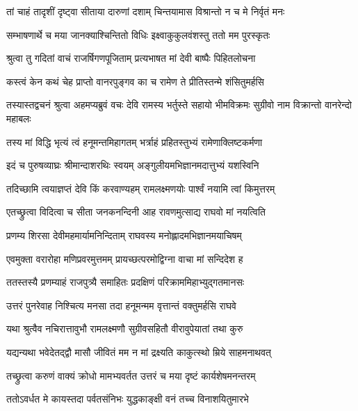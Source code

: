 \twolineshloka
{तां चाहं तादृशीं दृष्ट्वा सीताया दारुणां दशाम्}
{चिन्तयामास विश्रान्तो न च मे निर्वृतं मनः} %

\twolineshloka
{सम्भाषणार्थे च मया जानक्याश्चिन्तितो विधिः}
{इक्ष्वाकुकुलवंशस्तु ततो मम पुरस्कृतः} %

\twolineshloka
{श्रुत्वा तु गदितां वाचं राजर्षिगणपूजिताम्}
{प्रत्यभाषत मां देवी बाष्पैः पिहितलोचना} %

\twolineshloka
{कस्त्वं केन कथं चेह प्राप्तो वानरपुङ्गव}
{का च रामेण ते प्रीतिस्तन्मे शंसितुमर्हसि} %

\threelineshloka
{तस्यास्तद्वचनं श्रुत्वा अहमप्यब्रुवं वचः}
{देवि रामस्य भर्तुस्ते सहायो भीमविक्रमः}
{सुग्रीवो नाम विक्रान्तो वानरेन्दो महाबलः} %

\twolineshloka
{तस्य मां विद्धि भृत्यं त्वं हनूमन्तमिहागतम्}
{भर्त्राहं प्रहितस्तुभ्यं रामेणाक्लिष्टकर्मणा} %

\twolineshloka
{इदं च पुरुषव्याघ्रः श्रीमान्दाशरथिः स्वयम्}
{अङ्गुलीयमभिज्ञानमदात्तुभ्यं यशस्विनि} %

\twolineshloka
{तदिच्छामि त्वयाज्ञप्तं देवि किं करवाण्यहम्}
{रामलक्ष्मणयोः पार्श्वं नयामि त्वां किमुत्तरम्} %

\twolineshloka
{एतच्छ्रुत्वा विदित्वा च सीता जनकनन्दिनी}
{आह रावणमुत्साद्य राघवो मां नयत्विति} %

\twolineshloka
{प्रणम्य शिरसा देवीमहमार्यामनिन्दिताम्}
{राघवस्य मनोह्लादमभिज्ञानमयाचिषम्} %

\twolineshloka
{एवमुक्ता वरारोहा मणिप्रवरमुत्तमम्}
{प्रायच्छत्परमोद्विग्ना वाचा मां सन्दिदेश ह} %

\twolineshloka
{ततस्तस्यै प्रणम्याहं राजपुत्र्यै समाहितः}
{प्रदक्षिणं परिक्राममिहाभ्युद्गतमानसः} %

\twolineshloka
{उत्तरं पुनरेवाह निश्चित्य मनसा तदा}
{हनूमन्मम वृत्तान्तं वक्तुमर्हसि राघवे} %

\twolineshloka
{यथा श्रुत्वैव नचिरात्तावुभौ रामलक्ष्मणौ}
{सुग्रीवसहितौ वीरावुपेयातां तथा कुरु} %

\twolineshloka
{यद्यन्यथा भवेदेतद्द्वौ मासौ जीवितं मम}
{न मां द्रक्ष्यति काकुत्स्थो म्रिये साहमनाथवत्} %

\twolineshloka
{तच्छ्रुत्वा करुणं वाक्यं क्रोधो मामभ्यवर्तत}
{उत्तरं च मया दृष्टं कार्यशेषमनन्तरम्} %

\twolineshloka
{ततोऽवर्धत मे कायस्तदा पर्वतसंनिभः}
{युद्धकाङ्क्षी वनं तच्च विनाशयितुमारभे} %

